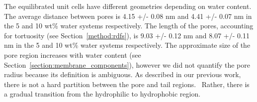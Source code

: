 \documentclass[journal=jpcbfk,manuscript=article]{achemso}
\begin{document}

  
  The equilibrated unit cells have different geometries depending on water
  content. The average distance between pores is 4.15 +/- 0.08 nm and 4.41 +/- 0.07 nm
  in the 5 and 10 wt\% water systems respectively. The length of the pores, accounting
  for tortuosity (see Section~\ref{method:rdfs}), is 9.03 +/- 0.12 nm and 8.07 +/- 0.11
  nm in the 5 and 10 wt\% water systems respectively. The approximate size of the pore
  region increases with water content (see Section~\ref{section:membrane_components}), 
  however we did not quantify the pore radius because its definition is ambiguous. As
  described in our previous work, there is not a hard partition between the pore and tail
  regions.~\cite{coscia_understanding_2019} Rather, there is a gradual transition from 
  the hydrophilic to hydrophobic region.
  
\end{document}
